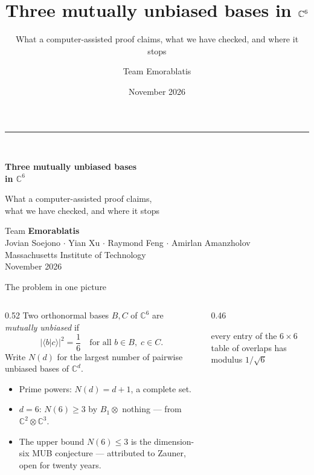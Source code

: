 \documentclass[aspectratio=169,10pt]{beamer}
\title{\bfseries Three mutually unbiased bases in $\C^6$}
\subtitle{What a computer-assisted proof claims, what we have checked, and where it stops}
\author{Team Emorablatis}
\date{November 2026}
\newcommand{\C}{\mathbb{C}}
\newcommand{\ip}[2]{\langle #1|#2\rangle}
\begin{document}
\begin{frame}[plain]
  \vspace*{6mm}
  {\color{acc}\rule{28mm}{2.2pt}}\\[5mm]
  {\huge\bfseries Three mutually unbiased bases\\[1mm] in $\C^6$\par}
  \vspace{4mm}
  {\large What a computer-assisted proof claims,\\ what we have checked, and where it stops\par}
  \vfill
  {\small Team \textbf{Emorablatis}\\[1.5mm]
   Jovian Soejono $\cdot$ Yian Xu $\cdot$ Raymond Feng $\cdot$ Amirlan Amanzholov\\[1.5mm]
   Massachusetts Institute of Technology\\[1mm]
   November 2026\par}
\end{frame}

\begin{frame}{The problem in one picture}
  \begin{columns}[T]
  \begin{column}{0.52\textwidth}
    Two orthonormal bases $B,C$ of $\C^6$ are \emph{mutually unbiased} if
    \[
      \bigl|\ip{b}{c}\bigr|^2=\frac16
      \quad\text{for all } b\in B,\; c\in C .
    \]
    Write $N(d)$ for the largest number of pairwise unbiased bases of $\C^d$.
    \medskip

    \begin{itemize}
      \item Prime powers: $N(d)=d+1$, a complete set.
      \item $d=6$: $N(6)\ge 3$ by $B_1\otimes$ nothing --- from $\C^2\otimes\C^3$.
      \item The upper bound $N(6)\le 3$ is the dimension-six MUB conjecture --- attributed to
            Zauner, open for twenty years.
    \end{itemize}
  \end{column}
  \begin{column}{0.46\textwidth}
    \centering

    \vspace{4mm}
    {\small\color{ink!70} every entry of the $6\times6$ table of overlaps has modulus $1/\sqrt6$}
  \end{column}
  \end{columns}
\end{frame}
\end{document}
